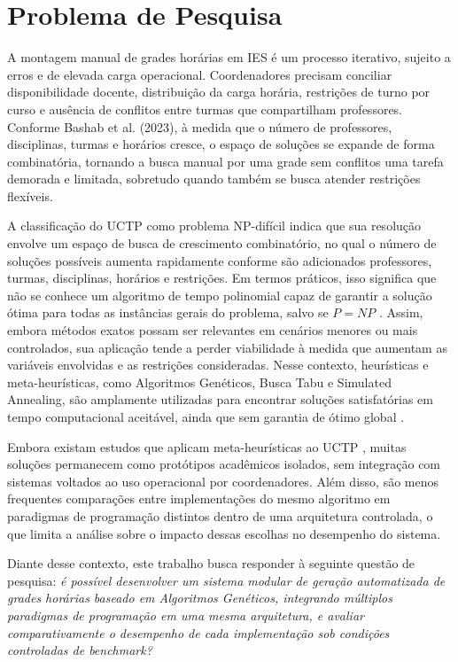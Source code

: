 \section{Problema de Pesquisa}
\label{sec:1.2}

A montagem manual de grades horárias em IES é um processo iterativo, sujeito a erros e de elevada carga operacional. Coordenadores precisam conciliar disponibilidade docente, distribuição da carga horária, restrições de turno por curso e ausência de conflitos entre turmas que compartilham professores. Conforme Bashab et al. (2023), à medida que o número de professores, disciplinas, turmas e horários cresce, o espaço de soluções se expande de forma combinatória, tornando a busca manual por uma grade sem conflitos uma tarefa demorada e limitada, sobretudo quando também se busca atender restrições flexíveis.

A classificação do UCTP como problema NP-difícil indica que sua resolução envolve um espaço de busca de crescimento combinatório, no qual o número de soluções possíveis aumenta rapidamente conforme são adicionados professores, turmas, disciplinas, horários e restrições. Em termos práticos, isso significa que não se conhece um algoritmo de tempo polinomial capaz de garantir a solução ótima para todas as instâncias gerais do problema, salvo se $P = NP$ \cite{premananda2024}. Assim, embora métodos exatos possam ser relevantes em cenários menores ou mais controlados, sua aplicação tende a perder viabilidade à medida que aumentam as variáveis envolvidas e as restrições consideradas. Nesse contexto, heurísticas e meta-heurísticas, como Algoritmos Genéticos, Busca Tabu e Simulated Annealing, são amplamente utilizadas para encontrar soluções satisfatórias em tempo computacional aceitável, ainda que sem garantia de ótimo global \cite{eiben2015}.


Embora existam estudos que aplicam meta-heurísticas ao UCTP \cite{ceschia2023, awad2022, elen2022}, muitas soluções permanecem como protótipos acadêmicos isolados, sem integração com sistemas voltados ao uso operacional por coordenadores. Além disso, são menos frequentes comparações entre implementações do mesmo algoritmo em paradigmas de programação distintos dentro de uma arquitetura controlada, o que limita a análise sobre o impacto dessas escolhas no desempenho do sistema.

Diante desse contexto, este trabalho busca responder à seguinte questão de pesquisa: \textit{é possível desenvolver um sistema modular de geração automatizada de grades horárias baseado em Algoritmos Genéticos, integrando múltiplos paradigmas de programação em uma mesma arquitetura, e avaliar comparativamente o desempenho de cada implementação sob condições controladas de benchmark?}
